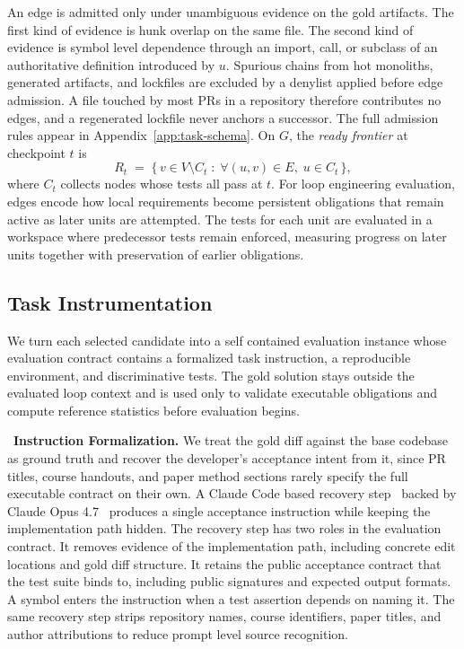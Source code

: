 

An edge is admitted only under unambiguous evidence on the gold artifacts. The first kind of evidence is hunk overlap on the same file. The second kind of evidence is symbol level dependence through an import, call, or subclass of an authoritative definition introduced by $u$. Spurious chains from hot monoliths, generated artifacts, and lockfiles are excluded by a denylist applied before edge admission. A file touched by most PRs in a repository therefore contributes no edges, and a regenerated lockfile never anchors a successor. The full admission rules appear in Appendix~\ref{app:task-schema}. On $G$, the \emph{ready frontier} at checkpoint $t$ is
\[
R_t \;=\; \{\, v \in V \setminus C_t \;:\; \forall (u,v) \in E,\; u \in C_t \,\},
\]
where $C_t$ collects nodes whose tests all pass at $t$.
For loop engineering evaluation, edges encode how local requirements become persistent obligations that remain active as later units are attempted.
The tests for each unit are evaluated in a workspace where predecessor tests remain enforced, measuring progress on later units together with preservation of earlier obligations.

\vspace{-3pt}
\subsection{Task Instrumentation}\label{sec:description-refine}

We turn each selected candidate into a self contained evaluation instance whose evaluation contract contains a formalized task instruction, a reproducible environment, and discriminative tests. The gold solution stays outside the evaluated loop context and is used only to validate executable obligations and compute reference statistics before evaluation begins.

~\textbf{Instruction Formalization.} We treat the gold diff against the base codebase as ground truth and recover the developer's acceptance intent from it, since PR titles, course handouts, and paper method sections rarely specify the full executable contract on their own.
A Claude Code based recovery step~\cite{claude_code} backed by Claude Opus 4.7~\cite{anthropic_opus47} produces a single acceptance instruction while keeping the implementation path hidden.
The recovery step has two roles in the evaluation contract. It removes evidence of the implementation path, including concrete edit locations and gold diff structure. It retains the public acceptance contract that the test suite binds to, including public signatures and expected output formats.
A symbol enters the instruction when a test assertion depends on naming it.
The same recovery step strips repository names, course identifiers, paper titles, and author attributions to reduce prompt level source recognition.

